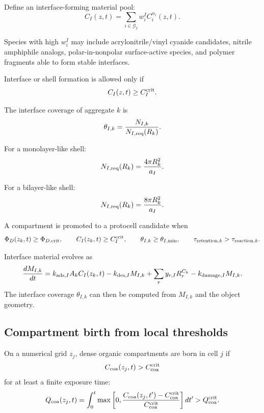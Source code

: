 \documentclass[11pt]{article}
\begin{document}
Define an interface-forming material pool:
\begin{equation}
C_I(z,t) = \sum_{i\in\mathcal{G}_I} w_i^I C_i^{\alpha_i}(z,t).
\end{equation}

Species with high $w_i^I$ may include acrylonitrile/vinyl cyanide candidates, nitrile amphiphile analogs, polar-in-nonpolar surface-active species, and polymer fragments able to form stable interfaces.

Interface or shell formation is allowed only if
\begin{equation}
C_I(z,t)\ge C_I^{\rm crit}.
\end{equation}

The interface coverage of aggregate $k$ is
\begin{equation}
\theta_{I,k}
=
\frac{N_{I,k}}{N_{I,\rm req}(R_k)}.
\end{equation}

For a monolayer-like shell:
\begin{equation}
N_{I,\rm req}(R_k)
=
\frac{4\pi R_k^2}{a_I}.
\end{equation}

For a bilayer-like shell:
\begin{equation}
N_{I,\rm req}(R_k)
=
\frac{8\pi R_k^2}{a_I}.
\end{equation}

A compartment is promoted to a protocell candidate when
\begin{equation}
\Phi_D(z_k,t)\ge \Phi_{D,\rm crit},
\qquad
C_I(z_k,t)\ge C_I^{\rm crit},
\qquad
\theta_{I,k}\geq \theta_{I,\min},
\qquad
\tau_{{\rm retention},k}>\tau_{{\rm reaction},k}.
\end{equation}

Interface material evolves as
\begin{equation}
\frac{dM_{I,k}}{dt}
=
k_{{\rm ads},I}A_k C_I(z_k,t)
-k_{{\rm des},I}M_{I,k}
+\sum_r y_{r,I}R_r^{C_k}
-k_{{\rm damage},I}M_{I,k}.
\end{equation}
The interface coverage $\theta_{I,k}$ can then be computed from $M_{I,k}$ and the object geometry.

\subsection{Compartment birth from local thresholds}

On a numerical grid $z_j$, dense organic compartments are born in cell $j$ if
\begin{equation}
C_{\rm coa}(z_j,t)>C_{\rm coa}^{\rm crit}
\end{equation}
for at least a finite exposure time:
\begin{equation}
Q_{\rm coa}(z_j,t)
=
\int_0^t
\max\left[
0,
\frac{C_{\rm coa}(z_j,t')-C_{\rm coa}^{\rm crit}}{C_{\rm coa}^{\rm crit}}
\right]dt'
>
Q_{\rm coa}^{\rm crit}.
\end{equation}
\end{document}
